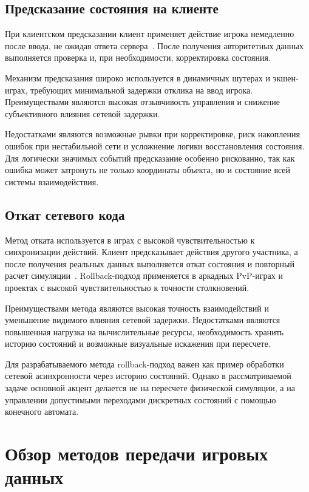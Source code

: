 \subsection{Предсказание состояния на клиенте}

При клиентском предсказании клиент применяет действие игрока немедленно после ввода, не ожидая ответа сервера~\cite{claypool2010latency}. После получения авторитетных данных выполняется проверка и, при необходимости, корректировка состояния.

Механизм предсказания широко используется в динамичных шутерах и экшен-играх, требующих минимальной задержки отклика на ввод игрока. Преимуществами являются высокая отзывчивость управления и снижение субъективного влияния сетевой задержки.

Недостатками являются возможные рывки при корректировке, риск накопления ошибок при нестабильной сети и усложнение логики восстановления состояния. Для логически значимых событий предсказание особенно рискованно, так как ошибка может затронуть не только координаты объекта, но и состояние всей системы взаимодействия.

\subsection{Откат сетевого кода}

Метод отката используется в играх с высокой чувствительностью к синхронизации действий. Клиент предсказывает действия другого участника, а после получения реальных данных выполняется откат состояния и повторный расчет симуляции~\cite{ggpo}. Rollback-подход применяется в аркадных PvP-играх и проектах с высокой чувствительностью к точности столкновений.

Преимуществами метода являются высокая точность взаимодействий и уменьшение видимого влияния сетевой задержки. Недостатками являются повышенная нагрузка на вычислительные ресурсы, необходимость хранить историю состояний и возможные визуальные искажения при пересчете.

Для разрабатываемого метода rollback-подход важен как пример обработки сетевой асинхронности через историю состояний. Однако в рассматриваемой задаче основной акцент делается не на пересчете физической симуляции, а на управлении допустимыми переходами дискретных состояний с помощью конечного автомата.

\section{Обзор методов передачи игровых данных}

